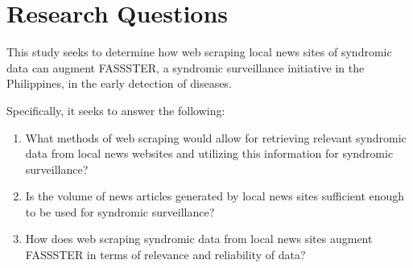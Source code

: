 \section{Research Questions}

This study seeks to determine how web scraping local news sites of syndromic data can augment FASSSTER, a syndromic surveillance initiative in the Philippines, in the early detection of diseases.

Specifically, it seeks to answer the following:
\begin{enumerate}
\item What methods of web scraping would allow for retrieving relevant syndromic data from local news websites and utilizing this information for syndromic surveillance?
\item Is the volume of news articles generated by local news sites sufficient enough to be used for syndromic surveillance?
\item How does web scraping syndromic data from local news sites augment FASSSTER in terms of relevance and reliability of data? 
\end{enumerate}